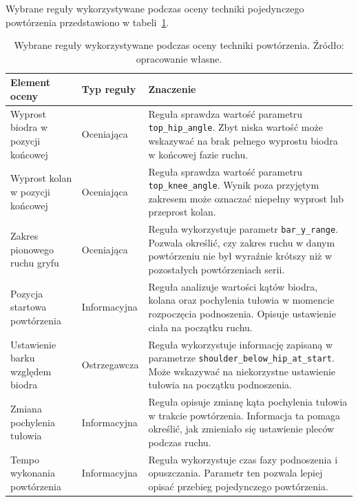 Wybrane reguły wykorzystywane podczas oceny techniki pojedynczego powtórzenia przedstawiono w tabeli~\ref{tab:reguly-oceny-techniki}.

\begin{table}[H]
\centering
\caption{Wybrane reguły wykorzystywane podczas oceny techniki powtórzenia. Źródło: opracowanie własne.}
\label{tab:reguly-oceny-techniki}
\vspace{0.3cm}
\footnotesize
\renewcommand{\arraystretch}{1.25}
\begin{tabular}{|p{3.8cm}|p{2.8cm}|p{7.0cm}|}
\hline
\textbf{Element oceny} & \textbf{Typ reguły} & \textbf{Znaczenie} \\
\hline

Wyprost biodra w pozycji końcowej & Oceniająca & Reguła sprawdza wartość parametru \texttt{top\_hip\_angle}. Zbyt niska wartość może wskazywać na brak pełnego wyprostu biodra w końcowej fazie ruchu. \\
\hline

Wyprost kolan w pozycji końcowej & Oceniająca & Reguła sprawdza wartość parametru \texttt{top\_knee\_angle}. Wynik poza przyjętym zakresem może oznaczać niepełny wyprost lub przeprost kolan. \\
\hline

Zakres pionowego ruchu gryfu & Oceniająca & Reguła wykorzystuje parametr \texttt{bar\_y\_range}. Pozwala określić, czy zakres ruchu w danym powtórzeniu nie był wyraźnie krótszy niż w pozostałych powtórzeniach serii. \\
\hline

Pozycja startowa powtórzenia & Informacyjna & Reguła analizuje wartości kątów biodra, kolana oraz pochylenia tułowia w momencie rozpoczęcia podnoszenia. Opisuje ustawienie ciała na początku ruchu. \\
\hline

Ustawienie barku względem biodra & Ostrzegawcza & Reguła wykorzystuje informację zapisaną w parametrze \texttt{shoulder\_below\_hip\_at\_start}. Może wskazywać na niekorzystne ustawienie tułowia na początku podnoszenia. \\
\hline

Zmiana pochylenia tułowia & Informacyjna & Reguła opisuje zmianę kąta pochylenia tułowia w trakcie powtórzenia. Informacja ta pomaga określić, jak zmieniało się ustawienie pleców podczas ruchu. \\
\hline

Tempo wykonania powtórzenia & Informacyjna & Reguła wykorzystuje czas fazy podnoszenia i opuszczania. Parametr ten pozwala lepiej opisać przebieg pojedynczego powtórzenia. \\
\hline

\end{tabular}
\end{table}

